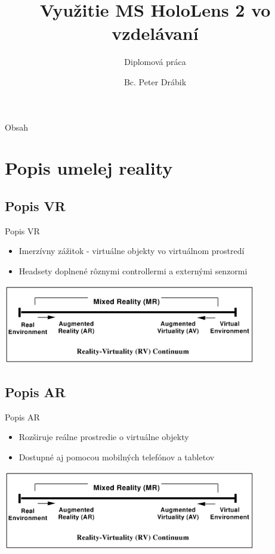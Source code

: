 \documentclass[pdf]{beamer}
\title{Využitie MS HoloLens 2 vo vzdelávaní}
\subtitle{Diplomová práca}
\author{Bc. Peter Drábik}
\begin{document}
\date{}
\begin{frame}
    \titlepage 
\end{frame}

\begin{frame}{Obsah}
    \tableofcontents
\end{frame}


\section{Popis umelej reality}

\subsection{Popis VR}
\begin{frame}{Popis VR}
    \begin{itemize}
        \item Imerzívny zážitok - virtuálne objekty vo virtuálnom prostredí
        \item Headsety doplnené rôznymi controllermi a externými senzormi
    \end{itemize}
    \begin{center}
        \includegraphics[width=11cm]{../img/continuum.png}
    \end{center}
\end{frame}

\subsection{Popis AR}
\begin{frame}{Popis AR}
    \begin{itemize}
        \item Rozširuje reálne prostredie o virtuálne objekty
        \item Dostupné aj pomocou mobilných telefónov a tabletov
    \end{itemize}
    \begin{center}
        \includegraphics[width=11cm]{../img/continuum.png}
    \end{center} 
\end{frame}
\end{document}
